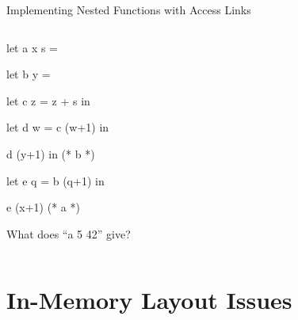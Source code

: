\documentclass{plt}
\begin{document}
\begin{frame}[fragile]{Implementing Nested Functions with Access Links}

\begin{columns}
  \begin{column}{0.5\textwidth}
\begin{ocaml}
let a x s =

  let b y =

    let c z = z + s in

    let d w = c (w+1) in

    d (y+1) in (* b *)

  let e q = b (q+1) in

e (x+1) (* a *)
\end{ocaml}

What does ``a 5 42'' give?


  \end{column}
  \begin{column}{0.5\textwidth}
      \begin{overlayarea}{\textwidth}{0.8\textheight}
      \end{overlayarea}
  \end{column}
\end{columns}
\end{frame}

\part{In-Memory Layout Issues}
\end{document}
